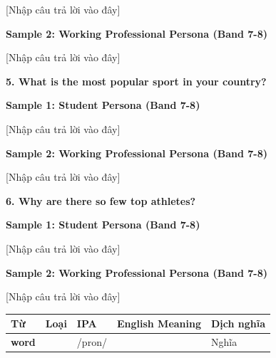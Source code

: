 [Nhập câu trả lời vào đây]

\textbf{Sample 2: Working Professional Persona (Band 7-8)}

[Nhập câu trả lời vào đây]

\separator

\begin{ieltsquestion}
\textbf{5. What is the most popular sport in your country?}
\end{ieltsquestion}
\textbf{Sample 1: Student Persona (Band 7-8)}

[Nhập câu trả lời vào đây]

\textbf{Sample 2: Working Professional Persona (Band 7-8)}

[Nhập câu trả lời vào đây]

\separator

\begin{ieltsquestion}
\textbf{6. Why are there so few top athletes?}
\end{ieltsquestion}
\textbf{Sample 1: Student Persona (Band 7-8)}

[Nhập câu trả lời vào đây]

\textbf{Sample 2: Working Professional Persona (Band 7-8)}

[Nhập câu trả lời vào đây]

\separator


\vspace{0.8em}
\begin{center}
\renewcommand{\arraystretch}{1.65}
\begin{tabularx}{\textwidth}{|V{0.22\textwidth}|C{0.07\textwidth}|I{0.20\textwidth}|Y|V{0.18\textwidth}|}
\hline
{}
\textbf{Từ} & \textbf{Loại} & \textbf{IPA} & \textbf{English Meaning} & \textbf{Dịch nghĩa} \\
\hline
\textbf{word} & & /pron/ & & Nghĩa \\ \hline
\end{tabularx}
\end{center}

\newpage

